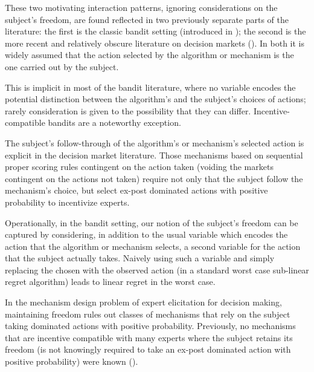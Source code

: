 These two motivating interaction patterns, ignoring considerations on the subject's freedom, are found reflected in two previously separate parts of the literature: the first is the classic bandit setting (introduced in \cite{thompson:33}); the second is the more recent and relatively obscure literature on decision markets (\cite{berg2003prediction,hanson2002decision,othman2010decision,boutilier2012eliciting,chen2014eliciting}). In both it is widely assumed that the action selected by the algorithm or mechanism is the one carried out by the subject.

This is implicit in most of the bandit literature, where no variable encodes the potential distinction between the algorithm's and the subject's choices of actions; rarely consideration is given to the possibility that they can differ. Incentive-compatible bandits \cite{kremer2014implementing,mansour2015bayesian,mansour2016bayesian} are a noteworthy exception.

The subject's follow-through of the algorithm's or mechanism's selected action is explicit in the decision market literature. Those mechanisms based on sequential proper scoring rules contingent on the action taken (voiding the markets contingent on the actions not taken) require not only that the subject follow the mechanism's choice, but select ex-post dominated actions with positive probability to incentivize experts.

Operationally, in the bandit setting, our notion of the subject's freedom can be captured by considering, in addition to the usual variable which encodes the action that the algorithm or mechanism selects, a second variable for the action that the subject actually takes. Naively using such a variable and simply replacing the chosen with the observed action (in a standard worst case sub-linear regret algorithm) leads to linear regret in the worst case.

In the mechanism design problem of expert elicitation for decision making, maintaining freedom rules out classes of mechanisms that rely on the subject taking dominated actions with positive probability. Previously, no mechanisms that are incentive compatible with many experts where the subject retains its freedom (is not knowingly required to take an ex-post dominated action with positive probability) were known (\cite{othman2010decision,chen2014eliciting}).



